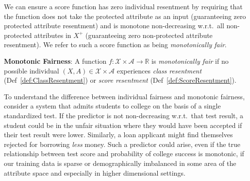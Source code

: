     We can ensure a score function has zero individual resentment by requiring that the function does not take the protected attribute as an input (guaranteeing zero protected attribute resentment) and is monotone non-decreasing w.r.t.\ all non-protected attributes in $X^+$ (guaranteeing zero non-protected attribute resentment). We refer to such a score function as being \textit{monotonically fair}.
    
        \begin{defn}
                {\bf Monotonic Fairness}: A function $f: \mathcal{X} \times \mathcal{A} \rightarrow \mathbb{R}$ is {\it monotonically fair} if no possible individual $(X, A) \in \mathcal{X}\times \mathcal{A}$ experiences {\it class resentment} (Def~\ref{def:ClassResentment}) or {\it score resentment} (Def~\ref{def:ScoreResentment}).
            \end{defn}

    To understand the difference between individual fairness and monotonic fairness, consider a system that admits students to college on the basis of a single standardized test. If the predictor is not non-decreasing w.r.t.\ that test result, a student could be in the unfair situation where they would have been accepted if their test result were lower. Similarly, a loan applicant might find themselves rejected for borrowing \textit{less} money. Such a predictor could arise, even if the true relationship between test score and probability of college success is monotonic, if our training data is sparse or demographically imbalanced in some area of the attribute space and especially in higher dimensional settings.
    

